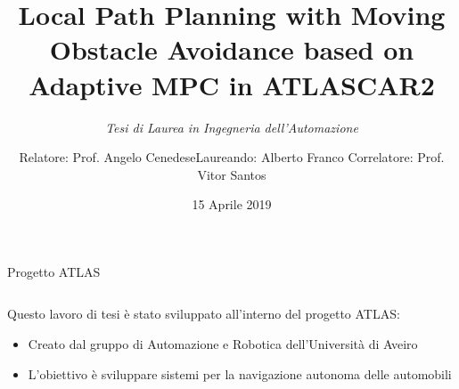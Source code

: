 \documentclass{beamer}
\title{Local Path Planning with Moving Obstacle Avoidance based on Adaptive MPC in ATLASCAR2}
\subtitle{\itshape Tesi di Laurea in Ingegneria dell'Automazione}
\author{Relatore: Prof. Angelo Cenedese\qquad\quad Laureando: Alberto Franco Correlatore: Prof. Vitor Santos}
\date{\vspace{0.4cm}15 Aprile 2019}
\begin{document}
	\maketitle

	\begin{frame}{Progetto ATLAS}
	  \begin{columns}[onlytextwidth,T]
	\begin{column}[c]{0.65\textwidth}
		Questo lavoro di tesi è stato sviluppato all'interno del progetto ATLAS:
		\begin{itemize}
			\item Creato dal gruppo di Automazione e Robotica dell'Università di Aveiro
			
			\item L'obiettivo è sviluppare sistemi per la navigazione autonoma delle automobili %
			

\end{itemize}
\end{column}
\end{columns}
\end{frame}
\end{document}
